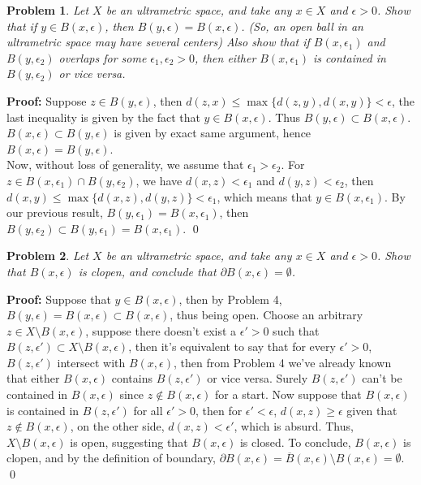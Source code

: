 \documentclass[12pt]{article}
\newtheorem{problem}{Problem}
\begin{document}
\begin{problem}
Let $X$ be an ultrametric space, and take any $x\in X$ and $\epsilon >0$. Show that if $y\in B(x, \epsilon)$, then $B(y,\epsilon)=B(x, \epsilon)$. (So, an open ball in an ultrametric space may have several centers) Also show that if $B(x,\epsilon_{1})$ and $B(y,\epsilon_{2})$ overlaps for some $\epsilon_{1}, \epsilon_{2}>0$, then either $B(x, \epsilon_{1})$ is contained in $B(y,\epsilon_{2})$ or vice versa.
\end{problem}

\textbf{Proof:} Suppose $z\in B(y, \epsilon)$, then $d(z, x)\leq \max\{d(z,y), d(x, y)\}<\epsilon$, the last inequality is given by the fact that $y\in B(x,\epsilon)$. Thus $B(y, \epsilon)\subset B(x,\epsilon)$. $B(x,\epsilon)\subset B(y,\epsilon)$ is given by exact same argument, hence $B(x,\epsilon)=B(y,\epsilon)$. \\
\indent Now, without loss of generality, we assume that $\epsilon_{1}>\epsilon_{2}$. For $z\in B(x,\epsilon_{1})\cap B(y,\epsilon_{2})$, we have $d(x,z)<\epsilon_{1}$ and $d(y,z)<\epsilon_{2}$, then $d(x,y)\leq\max\{d(x, z), d(y, z)\}<\epsilon_{1}$, which means that $y\in B(x,\epsilon_{1})$. By our previous result, $B(y,\epsilon_{1})=B(x,\epsilon_{1})$, then $B(y, \epsilon_{2})\subset B(y, \epsilon_{1})=B(x,\epsilon_{1})$. \qed \\

\begin{problem}
Let $X$ be an ultrametric space, and take any $x\in X$ and $\epsilon >0$. Show that $B(x,\epsilon)$ is clopen, and conclude that $\partial B(x,\epsilon)=\emptyset$.
\end{problem}

\textbf{Proof:} Suppose that $y\in B(x,\epsilon)$, then by Problem 4, $B(y,\epsilon)=B(x,\epsilon)\subset B(x,\epsilon)$, thus being open. Choose an arbitrary $z\in X\setminus B(x,\epsilon)$, suppose there doesn't exist a $\epsilon'>0$ such that $B(z,\epsilon')\subset X\setminus B(x,\epsilon)$, then it's equivalent to say that for every $\epsilon'>0$, $B(z,\epsilon')$ intersect with $B(x,\epsilon)$, then from Problem 4 we've already known that either $B(x,\epsilon)$ contains $B(z,\epsilon')$ or vice versa. Surely $B(z,\epsilon')$ can't be contained in $B(x,\epsilon)$ since $z\notin B(x,\epsilon)$ for a start. Now suppose that $B(x,\epsilon)$ is contained in $B(z,\epsilon')$ for all $\epsilon'>0$, then for $\epsilon'<\epsilon$, $d(x,z)\geq\epsilon$ given that $z\notin B(x,\epsilon)$, on the other side, $d(x,z)< \epsilon'$, which is absurd. Thus, $X\setminus B(x,\epsilon)$ is open, suggesting that $B(x,\epsilon)$ is closed. To conclude, $B(x,\epsilon)$ is clopen, and by the definition of boundary, $\partial B(x,\epsilon)=\overline{B}(x,\epsilon)\setminus B(x,\epsilon)=\emptyset$. \qed \\
\end{document}
